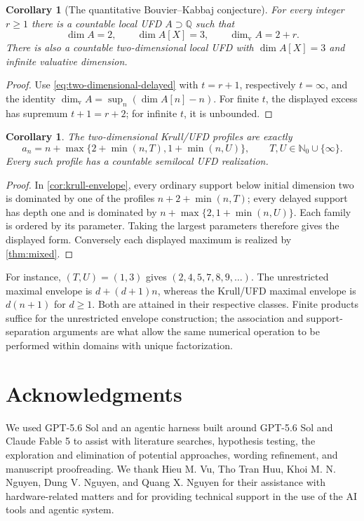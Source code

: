 \documentclass[11pt,reqno]{amsart}
\numberwithin{equation}{section}
\theoremstyle{plain}
\newtheorem{corollary}[theorem]{Corollary}
\theoremstyle{definition}
\theoremstyle{remark}
\begin{document}
\begin{corollary}[The quantitative Bouvier--Kabbaj conjecture]\label{cor:bouvier-defect}
For every integer \(r\ge1\) there is a countable local UFD
\(A\supset\mathbb Q\) such that
\[
 \dim A=2,\qquad \dim A[X]=3,\qquad \dim_{\mathrm v}A=2+r.
\]
There is also a countable two-dimensional local UFD with
\(\dim A[X]=3\) and infinite valuative dimension.
\end{corollary}
\begin{proof}
Use \eqref{eq:two-dimensional-delayed} with \(t=r+1\),
respectively \(t=\infty\), and the identity
\(\dim_{\mathrm v}A=\sup_n(\dim A[n]-n)\).
For finite \(t\), the displayed excess has supremum
\(t+1=r+2\); for infinite \(t\), it is unbounded.
\end{proof}

\begin{corollary}\label{cor:two-dimensional-full}
The two-dimensional Krull/UFD profiles are exactly
\[
 a_n=n+\max\{2+\min(n,T),1+\min(n,U)\},
 \qquad T,U\in\mathbb N_0\cup\{\infty\}.
\]
Every such profile has a countable semilocal UFD realization.
\end{corollary}
\begin{proof}
In \cref{cor:krull-envelope}, every ordinary support below
initial dimension two is dominated by one of the profiles
\(n+2+\min(n,T)\); every delayed support has depth one and
is dominated by \(n+\max\{2,1+\min(n,U)\}\). Each family
is ordered by its parameter. Taking the largest parameters
therefore gives the displayed form. Conversely each displayed
maximum is realized by \cref{thm:mixed}.
\end{proof}

For instance, \((T,U)=(1,3)\) gives
\((2,4,5,7,8,9,\ldots)\). The unrestricted maximal envelope
is \(d+(d+1)n\), whereas the Krull/UFD maximal envelope is
\(d(n+1)\) for \(d\ge1\). Both are attained in their respective classes.
Finite products suffice for the unrestricted envelope construction;
the association and support-separation arguments are what allow
the same numerical operation to be performed within domains
with unique factorization.


\renewcommand{\sectionname}{}
\section*{Acknowledgments}
We used GPT-5.6 Sol and an agentic harness built around GPT-5.6 Sol and Claude Fable 5 to assist with literature searches, hypothesis testing, the exploration and elimination of potential approaches, wording refinement, and manuscript proofreading. We thank Hieu M. Vu, Tho Tran Huu, Khoi M. N. Nguyen, Dung V. Nguyen, and Quang X. Nguyen for their assistance with hardware-related matters and for providing technical support in the use of the AI tools and agentic system.


\begingroup
\footnotesize
\raggedright

\endgroup
\end{document}
